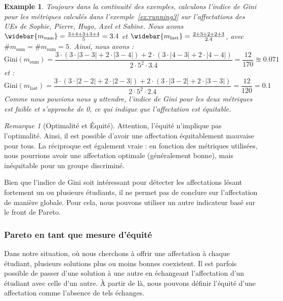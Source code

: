 \documentclass{rapport}
\theoremstyle{definition}
\theoremstyle{remark}
\theoremstyle{plain}
\newtheorem{example}{Example}
\theoremstyle{definition}
\theoremstyle{definition}
\theoremstyle{remark}
\newtheorem{remark}{Remarque}
\theoremstyle{definition}
\begin{document}
\begin{example}\label{ex:running5}
    Toujours dans la continuité des exemples, calculons l'indice de Gini pour les métriques calculés dans l'exemple~\ref{ex:running3} sur l'affectations des UEs de Sophie, Pierre, Hugo, Axel et Sabine.
    Nous avons $\widebar{m_\text{sum}} = \frac{3+4+3+3+4}{5}=3.4$ et $\widebar{m_\text{last}} = \frac{2+3+2+2+3}{2.4}$, avec $\#m_{\text{sum}} = \#m_{\text{sum}} = 5$.
    Ainsi, nous avons :
    $$
    \text{Gini}(m_{\text{sum}}) = \frac{3\cdot\left(3\cdot|3-3|+2\cdot|3-4|\right)+2\cdot\left(3\cdot|4-3|+2\cdot|4-4|\right)}{2\cdot5^2\cdot3.4} = \frac{12}{170} \approxeq 0.071
    $$
    et :
    $$
    \text{Gini}(m_{\text{last}}) = \frac{3\cdot\left(3\cdot|2-2|+2\cdot|2-3|\right)+2\cdot\left(3\cdot|3-2|+2\cdot|3-3|\right)}{2\cdot5^2\cdot2.4} = \frac{12}{120} = 0.1
    $$
    Comme nous pouvions nous y attendre, l'indice de Gini pour les deux métriques est faible et s'approche de 0, ce qui indique que l'affectation est équitable.
\end{example}

\begin{remark}[Optimalité et Équité]
    Attention, l'équité n'implique pas l'optimalité. Ainsi, il est possible d'avoir une affectation équitablement mauvaise pour tous.
    La réciproque est également vraie : en fonction des métriques utilisées, nous pourrions avoir une affectation optimale (généralement bonne), mais inéquitable pour un groupe discriminé.
\end{remark}

Bien que l'indice de Gini soit intéressant pour détecter les affectations lésant fortement un ou plusieurs étudiants, il ne permet pas de conclure sur l'affectation de manière globale.
Pour cela, nous pouvons utiliser un autre indicateur basé sur le front de Pareto.

\subsubsection{Pareto en tant que mesure d'équité}
Dans notre situation, où nous cherchons à offrir une affectation à chaque étudiant, plusieurs solutions plus ou moins bonnes coexistent.
Il est parfois possible de passer d'une solution à une autre en échangeant l'affectation d'un étudiant avec celle d'un autre.
À partir de là, nous pouvons définir l'équité d'une affectation comme l'absence de tels échanges.
\end{document}
